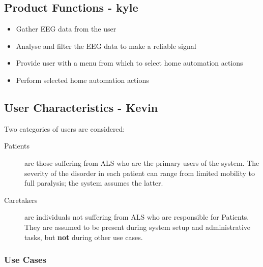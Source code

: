 \documentclass{article}
\begin{document}
\subsection{Product Functions - kyle}
\begin{itemize}
\item Gather EEG data from the user
\item Analyse and filter the EEG data to make a reliable signal
\item Provide user with a menu from which to select home automation actions
\item Perform selected home automation actions
\end{itemize}

\subsection{User Characteristics - Kevin}

Two categories of users are considered:

\begin{description}
    \item[Patients] are those suffering from ALS who are the primary users of
        the system. The severity of the disorder in each patient can range
        from limited mobility to full paralysis; the system assumes the
        latter.
    \item[Caretakers] are individuals not suffering from ALS who are
        responsible for Patients. They are assumed to be present during system
        setup and administrative tasks, but \textbf{not} during other use
        cases.
\end{description}

\subsubsection{Use Cases}

\end{document}
